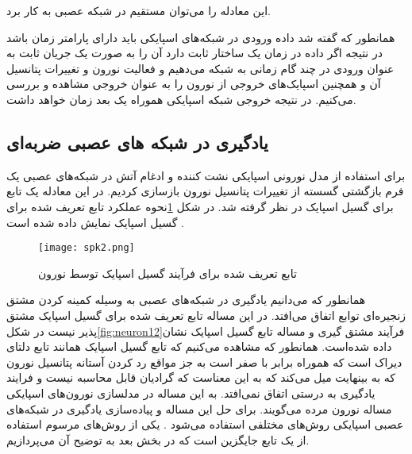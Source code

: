 
این معادله را می‌توان مستقیم در شبکه عصبی به کار برد. 


همانطور که گفته شد داده ورودی در شبکه‌های اسپایکی باید دارای پارامتر زمان باشد در نتیجه اگر داده در زمان یک ساختار ثابت دارد آن را به صورت یک جریان ثابت به عنوان ورودی در چند گام زمانی 
به شبکه می‌دهیم و فعالیت نورون و تغییرات پتانسیل آن و همچنین اسپایک‌های خروجی از نورون را به عنوان خروجی مشاهده و بررسی می‌کنیم. در نتیجه خروجی شبکه اسپایکی هموراه یک بعد زمان خواهد داشت.


\subsection{ یادگیری در شبکه های عصبی ضربه‌ای}

برای استفاده از مدل نورونی اسپایکی نشت کننده و ادغام آتش در شبکه‌های عصبی یک فرم بازگشتی گسسته از تغییرات پتانسیل نورون بازسازی کردیم. در این معادله یک تابع برای گسیل اسپایک در نظر گرفته شد. در شکل \ref{fig:neuron11}نحوه عملکرد تابع تعریف شده برای گسیل اسپایک نمایش داده شده است .

 \begin{figure}[htbp]
	\centering
	\texttt{[image: spk2.png]}
	\captionsetup{font=small} %
	\caption{تابع تعریف شده برای فرآیند گسیل اسپایک توسط نورون }
	\label{fig:neuron11}
\end{figure}

همانطور که می‌دانیم یادگیری در شبکه‌های عصبی به وسیله کمینه کردن مشتق زنجیره‌ای توابع اتفاق می‌افتد. در این مساله تابع تعریف شده برای گسیل اسپایک مشتق پذیر نیست در شکل\ref{fig:neuron12}فرآیند مشتق گیری و مساله تابع گسیل اسپایک نشان داده شده‌است. همانطور که مشاهده می‌کنیم که تابع گسیل اسپایک همانند  تابع دلتای دیراک است که هموراه برابر با صفر است به جز مواقع رد کردن آستانه پتانسیل نورون که به بینهایت میل می‌کند که به این معناست که گرادیان قابل محاسبه نیست و فرایند یادگیری به درستی اتفاق نمی‌افتد. به این مساله در مدلسازی نورون‌های اسپایکی مساله نورون مرده  می‌گویند.
برای حل این مساله و پیاده‌سازی یادگیری در شبکه‌های عصبی اسپایکی روش‌های مختلفی استفاده می‌شود . یکی از روش‌های مرسوم استفاده از یک تابع جایگزین است که در بخش بعد به توضیح آن می‌پردازیم.

